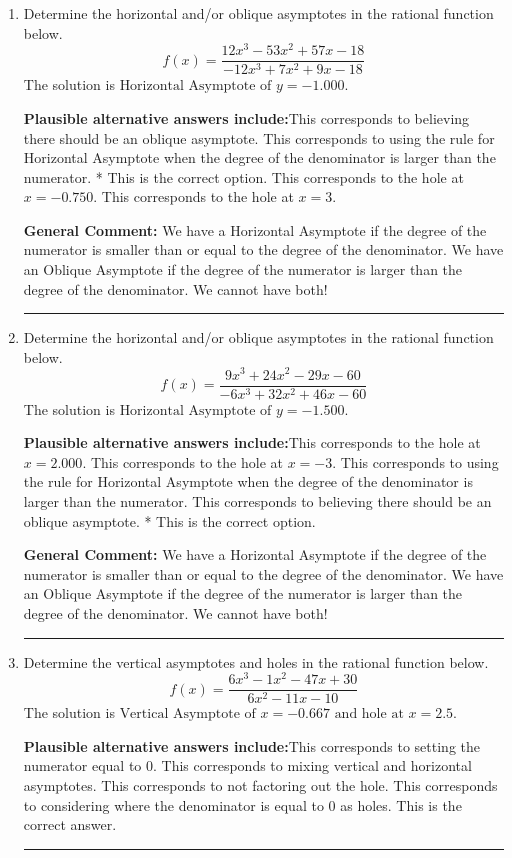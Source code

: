 \documentclass{extbook}[14pt]
\newcommand{\litem}[1]{\item #1

\rule{\textwidth}{0.4pt}}
\begin{document}
\begin{enumerate}\litem{
Determine the horizontal and/or oblique asymptotes in the rational function below.
\[ f(x) = \frac{12x^{3} -53 x^{2} +57 x -18}{-12x^{3} +7 x^{2} +9 x -18} \]The solution is \( \text{Horizontal Asymptote of } y = -1.000  \).\begin{enumerate}[label=\Alph*.]
\textbf{Plausible alternative answers include:}This corresponds to believing there should be an oblique asymptote.
This corresponds to using the rule for Horizontal Asymptote when the degree of the denominator is larger than the numerator.
* This is the correct option.
This corresponds to the hole at $x = -0.750$.
This corresponds to the hole at $x = 3$.
\end{enumerate}

\textbf{General Comment:} We have a Horizontal Asymptote if the degree of the numerator is smaller than or equal to the degree of the denominator. We have an Oblique Asymptote if the degree of the numerator is larger than the degree of the denominator. We cannot have both!
}
\litem{
Determine the horizontal and/or oblique asymptotes in the rational function below.
\[ f(x) = \frac{9x^{3} +24 x^{2} -29 x -60}{-6x^{3} +32 x^{2} +46 x -60} \]The solution is \( \text{Horizontal Asymptote of } y = -1.500  \).\begin{enumerate}[label=\Alph*.]
\textbf{Plausible alternative answers include:}This corresponds to the hole at $x = 2.000$.
This corresponds to the hole at $x = -3$.
This corresponds to using the rule for Horizontal Asymptote when the degree of the denominator is larger than the numerator.
This corresponds to believing there should be an oblique asymptote.
* This is the correct option.
\end{enumerate}

\textbf{General Comment:} We have a Horizontal Asymptote if the degree of the numerator is smaller than or equal to the degree of the denominator. We have an Oblique Asymptote if the degree of the numerator is larger than the degree of the denominator. We cannot have both!
}
\litem{
Determine the vertical asymptotes and holes in the rational function below.
\[ f(x) = \frac{6x^{3} -1 x^{2} -47 x + 30}{6x^{2} -11 x -10} \]The solution is \( \text{Vertical Asymptote of } x = -0.667 \text{ and hole at } x = 2.5 \).\begin{enumerate}[label=\Alph*.]
\textbf{Plausible alternative answers include:}This corresponds to setting the numerator equal to 0.
This corresponds to mixing vertical and horizontal asymptotes.
This corresponds to not factoring out the hole.
This corresponds to considering where the denominator is equal to 0 as holes.
This is the correct answer.
\end{enumerate}

}
\end{enumerate}
\end{document}
